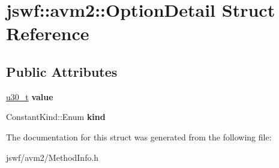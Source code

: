 \hypertarget{structjswf_1_1avm2_1_1_option_detail}{\section{jswf\+:\+:avm2\+:\+:Option\+Detail Struct Reference}
\label{structjswf_1_1avm2_1_1_option_detail}
}
\subsection*{Public Attributes}
\begin{DoxyCompactItemize}
\item 
\hypertarget{structjswf_1_1avm2_1_1_option_detail_afe22d28d8512020915ae27ba251113c4}{\hyperlink{namespacejswf_aa10d9ddca2a6a5debdc261dfae3d1117}{u30\+\_\+t} {\bfseries value}}\label{structjswf_1_1avm2_1_1_option_detail_afe22d28d8512020915ae27ba251113c4}

\item 
\hypertarget{structjswf_1_1avm2_1_1_option_detail_a019425505b307843b498ef7bc06ef800}{Constant\+Kind\+::\+Enum {\bfseries kind}}\label{structjswf_1_1avm2_1_1_option_detail_a019425505b307843b498ef7bc06ef800}

\end{DoxyCompactItemize}


The documentation for this struct was generated from the following file\+:\begin{DoxyCompactItemize}
\item 
jswf/avm2/Method\+Info.\+h\end{DoxyCompactItemize}
